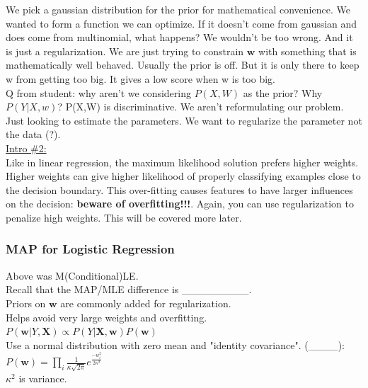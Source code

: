 We pick a gaussian distribution for the prior for mathematical convenience.
	We wanted to form a function we can optimize.
	If it doesn't come from gaussian and does come from multinomial, what happens? 
	We wouldn't be too wrong.  And it is just a regularization.  
	We are just trying to constrain $\bm{w}$ with something that is mathematically well behaved.
	Usually the prior is off. But it is only there to keep w from getting too big.  It gives a low score when w is too big.   \hfill \\

Q from student: why aren't we considering $P(X,W)$ as the prior? Why $P(Y|X, w)$?
	P(X,W) is discriminative.  
	We aren't reformulating our problem.  Just looking to estimate the parameters. 
	We want to regularize the parameter not the data (?).    \hfill \\
 
 \underline{Intro \#2:}   \hfill \\
 
Like in linear regression, the maximum likelihood solution prefers higher weights.  
Higher weights can give higher likelihood of properly classifying examples close to the decision boundary.  
This over-fitting causes features to have larger influences on the decision:  \textbf{beware of overfitting!!!}. 
Again, you can use regularization to penalize high weights.
This will be covered more later. 
\hfill \\

\subsubsection{MAP for Logistic Regression}
Above was M(Conditional)LE.     \hfill \\
Recall that the MAP/MLE difference is \_\_\_\_\_\_\_\_\_.  \hfill \\
Priors on $\bm{w}$ are commonly added for regularization.    \hfill \\
Helps avoid very large weights and overfitting.    \hfill \\
$P(\bm{w} | Y, \bm{X}) \propto P(Y | \bm{X}, \bm{w} ) P(\bm{w} )$  \hfill \\
Use a normal distribution with zero mean and "identity covariance".  (\_\_\_\_):  \hfill \\
$ \displaystyle  P(\bm{w} ) = \prod_i \frac{1}{\kappa \sqrt{2 \pi}} e^{\frac{-w_i^2}{2 \kappa^2}}$ \hfill \\
$\kappa^2$ is variance.  \hfill \\
\hfill \\


